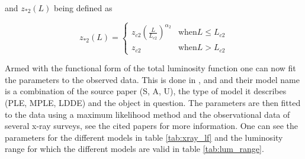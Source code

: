 and $z_{*2}(L)$ being defined as

\begin{equation}
    z_{*2}(L) =
    \begin{cases}
        z_{c2} \left( \frac{L}{L_{c2}} \right)^{\alpha_2} & \text{when} L \leq L_{c2} \\
        z_{c2} & \text{when} L > L_{c2}
    \end{cases}
\end{equation}



Armed with the functional form of the total luminosity function one can now fit the parameters to the observed data. This is done in \cite{Silverman_2008}, \cite{Ajello_2009} and \cite{Ueda_2014} and their 
model name is a combination of the source paper (S, A, U), the type of model it describes (PLE, MPLE, LDDE) and the object in question. The parameters are then fitted to the data using a maximum likelihood method and the observational data of several x-ray surveys, see the cited papers for more information.
One can see the parameters for the different models in table \ref{tab:xray_lf} and the luminosity range for which the different models are valid in table \ref{tab:lum_range}. 
